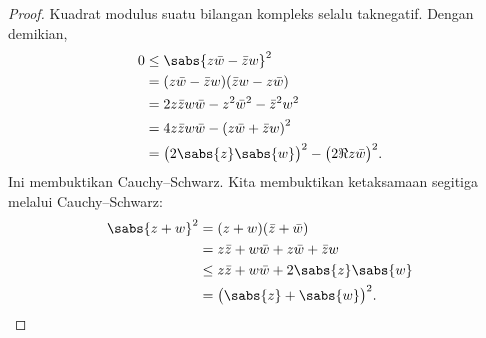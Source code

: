 
\begin{proof}
Kuadrat modulus suatu bilangan kompleks selalu taknegatif.
Dengan demikian,
\begin{equation*}
\begin{split}
0 & \leq {\sabs{z\bar{w}-\bar{z}w}}^2 \\
  & =    (z\bar{w}-\bar{z}w)(\bar{z}w-z\bar{w}) \\
  & =    2z\bar{z}w\bar{w} - z^2\bar{w}^2 - \bar{z}^2w^2 \\
  & =    4z\bar{z}w\bar{w} - {(z\bar{w}+\bar{z}w)}^2 \\
  & =    {\bigl(2\sabs{z}\sabs{w}\bigr)}^2 - {\bigl(2 \Re z\bar{w}\bigr)}^2 .
\end{split}
\end{equation*}
Ini membuktikan Cauchy--Schwarz.
Kita membuktikan ketaksamaan segitiga melalui Cauchy--Schwarz:
\begin{equation*}
\begin{split}
{\sabs{z+w}}^2 & =    (z+w)(\bar{z}+\bar{w}) \\
               & =    z\bar{z} + w\bar{w} + z\bar{w} + \bar{z}w \\
               & \leq z\bar{z} + w\bar{w} + 2 \sabs{z}\sabs{w} \\
               & =    {\bigl(\sabs{z}+\sabs{w}\bigr)}^2 . \qedhere
\end{split}
\end{equation*}
\end{proof}
